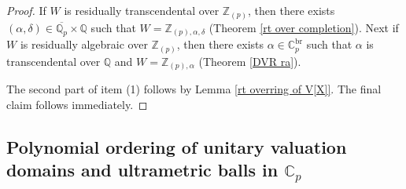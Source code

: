 \documentclass[10pt]{article}
\numberwithin{equation}{section}
\newtheorem{Cor}[equation]{Corollary}
\theoremstyle{definition}
\theoremstyle{definition}
\newcommand{\Q}{\mathbb{Q}}
\newcommand{\Z}{\mathbb{Z}}
\newcommand{\C}{\mathbb{C}}
\renewcommand{\O}{\mathbb{O}}
\newcommand{\PP}{\mathbb{P}}
\newcommand{\oQp}{\overline{\Q_p}}
\newcommand{\ra}{\text{ra}}
\newcommand{\rt}{\text{rt}}
\newcommand{\br}{\text{br}}
\newcommand\rc { \color{red}}
\newcommand\bc { \color{blue}}
\begin{document}
\begin{proof}
If $W$ is residually transcendental over $\Z_{(p)}$, then there exists $(\alpha,\delta)\in\oQp\times\Q$ 
such that $W=\Z_{(p),\alpha,\delta}$ (Theorem \ref{rt over completion}).
Next if $W$ is residually algebraic over $\Z_{(p)}$, then there exists $\alpha\in\C_p^{\br}$ 
such that  $\alpha$ is transcendental over $\Q$ and  $W=\Z_{(p),\alpha}$ (Theorem \ref{DVR ra}). 

The second part of item (1) follows by Lemma \ref{rt overring of V[X]}. The final claim follows immediately.
\end{proof}







\subsection{Polynomial ordering of unitary  valuation domains and ultrametric balls in $\C_p$}\label{Polordering monomial}
\end{document}

